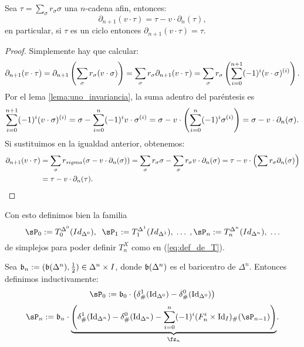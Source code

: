 \documentclass[../../topologia_algebraica]{subfiles}
\begin{document}
\begin{lema}\label{lema:dos_invariancia}
  Sea $\tau=\sum_{\sigma}r_{\sigma}\sigma$ una $n$-cadena afin, entonces:
  \[
    \partial_{n+1}(v\cdot\tau)=\tau-v\cdot\partial_n(\tau),
  \]
  en particular, si $\tau$ es un ciclo entonces $\partial_{n+1}(v\cdot\tau)=\tau$.
\end{lema}
\begin{proof}
  Simplemente hay que calcular:
  \[
    \partial_{n+1}(v\cdot\tau)=\partial_{n+1}\left( \sum_{\sigma}r_{\sigma}(v\cdot\sigma) \right)=
    \sum_{\sigma}r_{\sigma}\partial_{n+1}(v\cdot\tau)=
    \sum_{\sigma}r_{\sigma}\left( \sum_{i=0}^{n+1}(-1)^i(v\cdot\sigma)^{(i)} \right).
  \]
  Por el lema \ref{lema:uno_invariancia}, la suma adentro del par\'entesis es
  \[
    \sum_{i=0}^{n+1}(-1)^i(v\cdot\sigma)^{(i)}=
    \sigma-\sum_{i=0}^{n}(-1)^iv\cdot\sigma^{(i)}=
    \sigma-v\cdot\left( \sum_{i=0}^n(-1)^i\sigma^{(i)} \right)=\sigma-v\cdot\partial_n(\sigma).
  \]
  Si sustituimos en la igualdad anterior, obtenemos:
  \begin{align*}
    \partial_{n+1}(v\cdot\tau) & =\sum_{\sigma}r_{sigma}(\sigma-v\cdot\partial_n(\sigma))=
    \sum_{\sigma}r_{\sigma}\sigma-\sum_{\sigma}r_{\sigma}v\cdot\partial_n(\sigma)=
    \tau-v\cdot\left( \sum r_{\sigma}\partial_n(\sigma) \right)\\ & =\tau-v\cdot\partial_n(\tau).
  \end{align*}  
\end{proof}

Con esto definimos bien la familia
\[
  \sP_0:=T_0^{\Delta^0}(Id_{\Delta^0}),\;\; \sP_1:=T_1^{\Delta^1}(Id_{\Delta^1}),\; \ldots\;,
  \sP_n:=T_n^{\Delta^n}(Id_{\Delta^n}),\; \ldots
\]
de simplejos para poder definir $T^X_n$ como en (\ref{eq:def_de_T}).

\begin{defin}
  Sea $\mathfrak{b}_n:=(\mathfrak{b}(\Delta^n),\tfrac{1}{2})\in \Delta^n\times I$, donde $\mathfrak{b}(\Delta^n)$
  es el baricentro de $\Delta^n$. Entonces definimos inductivamente:
  \begin{equation*}
    \sP_0:=\fb_0\cdot\paren{\delta^1_{\#}(\Id_{\Delta^0})-\delta^0_{\#}(\Id_{\Delta^0})}
  \end{equation*}
  \begin{equation*}
    \sP_n:=\fb_n\cdot\underset{\fz_n}{\underbrace{\paren{\delta^1_{\#}(\Id_{\Delta^n})-
          \delta^0_{\#}(\Id_{\Delta^n})-
    \sum_{i=0}^n(-1)^i(F^i_n\times\Id_I)_{\#}(\sP_{n-1})}}}.
  \end{equation*}
\end{defin}
\end{document}
